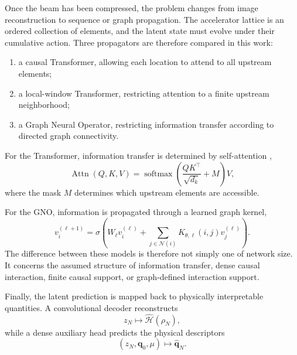 Once the beam has been compressed, the problem changes from image reconstruction to sequence or graph propagation. The accelerator lattice is an ordered collection of elements, and the latent state must evolve under their cumulative action. Three propagators are therefore compared in this work:
\begin{enumerate}
    \item a causal Transformer, allowing each location to attend to all upstream elements;
    \item a local-window Transformer, restricting attention to a finite upstream neighborhood;
    \item a Graph Neural Operator, restricting information transfer according to directed graph connectivity.
\end{enumerate}

For the Transformer, information transfer is determined by self-attention \cite{vaswani_attention_2017},
\begin{equation}
    \operatorname{Attn}(Q,K,V)
    =
    \operatorname{softmax}
    \left(
    \frac{QK^{\top}}{\sqrt{d_k}}
    +
    M
    \right)V,
    \label{eq:ml_intro_attention}
\end{equation}
where the mask $M$ determines which upstream elements are accessible.

For the GNO, information is propagated through a learned graph kernel,
\begin{equation}
    v_i^{(\ell+1)}
    =
    \sigma
    \left(
    W_{\ell}v_i^{(\ell)}
    +
    \sum_{j\in\mathcal{N}(i)}
    K_{\theta,\ell}(i,j)
    v_j^{(\ell)}
    \right).
    \label{eq:ml_intro_gno}
\end{equation}
The difference between these models is therefore not simply one of network size. It concerns the assumed structure of information transfer, dense causal interaction, finite causal support, or graph-defined interaction support.

Finally, the latent prediction is mapped back to physically interpretable quantities. A convolutional decoder reconstructs
\begin{equation}
    z_N
    \longmapsto
    \widehat{\mathcal{H}}(\rho_N),
\end{equation}
while a dense auxiliary head predicts the physical descriptors
\begin{equation}
    (z_N,\bm q_0,\mu)
    \longmapsto
    \widehat{\bm q}_N.
\end{equation}

